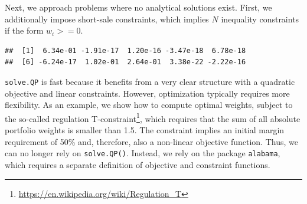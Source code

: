 \documentclass[
]{krantz}
\newenvironment{Shaded}{\begin{snugshade}}{\end{snugshade}}
\newcommand{\AttributeTok}[1]{\textcolor[rgb]{0.61,0.61,0.61}{#1}}
\newcommand{\DecValTok}[1]{\textcolor[rgb]{0.06,0.06,0.06}{#1}}
\newcommand{\FunctionTok}[1]{\textcolor[rgb]{0,0,0}{#1}}
\newcommand{\NormalTok}[1]{#1}
\newcommand{\OtherTok}[1]{\textcolor[rgb]{0.37,0.37,0.37}{#1}}
\newcommand{\SpecialCharTok}[1]{\textcolor[rgb]{0,0,0}{#1}}
\renewcommand{\href}[2]{#2\footnote{\url{#1}}}
\begin{document}
Next, we approach problems where no analytical solutions exist. First, we additionally impose short-sale constraints, which implies \(N\) inequality constraints if the form \(w_i >=0\).

\begin{Shaded}
\end{Shaded}

\begin{verbatim}
##  [1]  6.34e-01 -1.91e-17  1.20e-16 -3.47e-18  6.78e-18
##  [6] -6.24e-17  1.02e-01  2.64e-01  3.38e-22 -2.22e-16
\end{verbatim}

\texttt{solve.QP} is fast because it benefits from a very clear structure with a quadratic objective and linear constraints. However, optimization typically requires more flexibility. As an example, we show how to compute optimal weights, subject to the so-called \href{https://en.wikipedia.org/wiki/Regulation_T}{regulation T-constraint}, which requires that the sum of all absolute portfolio weights is smaller than 1.5. The constraint implies an initial margin requirement of 50\% and, therefore, also a non-linear objective function. Thus, we can no longer rely on \texttt{solve.QP()}. Instead, we rely on the package \texttt{alabama}, which requires a separate definition of objective and constraint functions.
\end{document}
